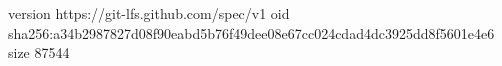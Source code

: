 version https://git-lfs.github.com/spec/v1
oid sha256:a34b2987827d08f90eabd5b76f49dee08e67cc024cdad4dc3925dd8f5601e4e6
size 87544
